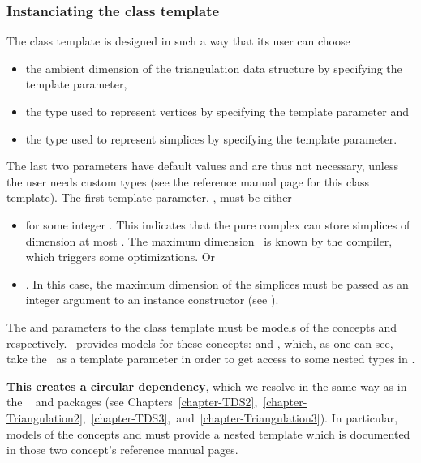 \subsubsection{Instanciating the class template}

The 
class template is designed in such a way that its user can choose
\begin{itemize}
\item the ambient dimension of the triangulation data structure by specifying the  template parameter,
\item the type used to represent vertices by specifying the 
template parameter and
\item the type used to represent simplices by specifying the
 template parameter.
\end{itemize}

The last two parameters have default values and are thus not necessary, unless
the user needs custom types (see the reference manual page for this class
template). The first template parameter, , must be either
\begin{itemize}
\item \ccPureGlobalScope{} for some integer \ad. This
indicates that the pure complex can store simplices of dimension at most
\ad. The maximum dimension \ad\ is known by the compiler, which
triggers some optimizations. Or
\item \ccPureGlobalScope{}. In this case, the maximum
dimension of the simplices must be passed as an integer argument to an instance
constructor (see ).
\end{itemize}

The  and  parameters to the class template
must be models of the concepts  and
 respectively. \cgal\ provides models for these
concepts:  and
, which, as one
can see, take the \tds\ as a template parameter in order to get access to
some nested types in \tds.

\textbf{This creates a circular dependency}, which we resolve in the same way
as in the \cgal\  and  packages (see
Chapters~\ref{chapter-TDS2},~\ref{chapter-Triangulation2},~\ref{chapter-TDS3},~and~\ref{chapter-Triangulation3}).
In particular, models of the concepts  and
 must provide a nested template 
which is documented in those two concept's reference manual pages.

